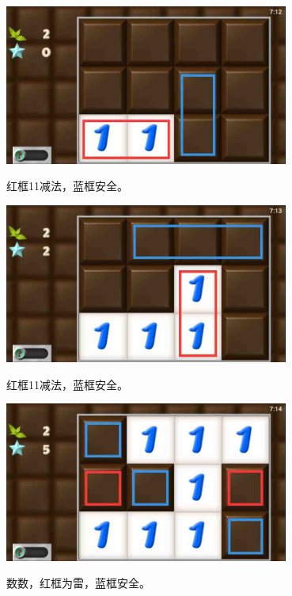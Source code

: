 \subsection{} %
\begin{center}
    \includegraphics[width=0.7\textwidth]{puzzlelow/2-1.jpg}
\end{center}
红框11减法，蓝框安全。
\begin{center}
    \includegraphics[width=0.7\textwidth]{puzzlelow/2-2.jpg}
\end{center}
红框11减法，蓝框安全。
\begin{center}
    \includegraphics[width=0.7\textwidth]{puzzlelow/2-3.jpg}
\end{center}
数数，红框为雷，蓝框安全。


